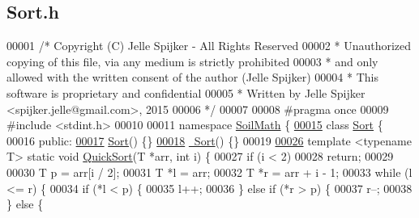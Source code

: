 \hypertarget{_sort_8h_source}{}\subsection{Sort.\+h}
\label{_sort_8h_source}

\begin{DoxyCode}
00001 \textcolor{comment}{/* Copyright (C) Jelle Spijker - All Rights Reserved}
00002 \textcolor{comment}{ * Unauthorized copying of this file, via any medium is strictly prohibited}
00003 \textcolor{comment}{ * and only allowed with the written consent of the author (Jelle Spijker)}
00004 \textcolor{comment}{ * This software is proprietary and confidential}
00005 \textcolor{comment}{ * Written by Jelle Spijker <spijker.jelle@gmail.com>, 2015}
00006 \textcolor{comment}{ */}
00007 
00008 \textcolor{preprocessor}{#pragma once}
00009 \textcolor{preprocessor}{#include <stdint.h>}
00010 
00011 \textcolor{keyword}{namespace }\hyperlink{namespace_soil_math}{SoilMath} \{
\hypertarget{_sort_8h_source_l00015}{}\hyperlink{class_soil_math_1_1_sort}{00015} \textcolor{keyword}{class }\hyperlink{class_soil_math_1_1_sort}{Sort} \{
00016 \textcolor{keyword}{public}:
\hypertarget{_sort_8h_source_l00017}{}\hyperlink{class_soil_math_1_1_sort_ac5553af8753454e71e6d621690fdab3f}{00017}   \hyperlink{class_soil_math_1_1_sort_ac5553af8753454e71e6d621690fdab3f}{Sort}() \{\}
\hypertarget{_sort_8h_source_l00018}{}\hyperlink{class_soil_math_1_1_sort_a62273dbd3620f999201abacdff5e2557}{00018}   \hyperlink{class_soil_math_1_1_sort_a62273dbd3620f999201abacdff5e2557}{~Sort}() \{\}
00019 
\hypertarget{_sort_8h_source_l00026}{}\hyperlink{class_soil_math_1_1_sort_adca7b48be7482f89767b806ad2016d67}{00026}   \textcolor{keyword}{template} <\textcolor{keyword}{typename} T> \textcolor{keyword}{static} \textcolor{keywordtype}{void} \hyperlink{class_soil_math_1_1_sort_adca7b48be7482f89767b806ad2016d67}{QuickSort}(T *arr, \textcolor{keywordtype}{int} i) \{
00027     \textcolor{keywordflow}{if} (i < 2)
00028       \textcolor{keywordflow}{return};
00029 
00030     T p = arr[i / 2];
00031     T *l = arr;
00032     T *r = arr + i - 1;
00033     \textcolor{keywordflow}{while} (l <= r) \{
00034       \textcolor{keywordflow}{if} (*l < p) \{
00035         l++;
00036       \} \textcolor{keywordflow}{else} \textcolor{keywordflow}{if} (*r > p) \{
00037         r--;
00038       \} \textcolor{keywordflow}{else} \{

\end{DoxyCode}
